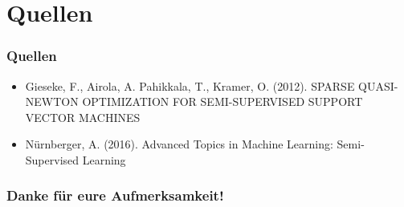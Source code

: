 \documentclass{beamer}
\begin{document}
\section{Quellen}

\begin{frame}
\frametitle{Quellen}
\begin{itemize}
\item Gieseke, F., Airola, A. Pahikkala, T., Kramer, O. (2012). SPARSE QUASI-NEWTON OPTIMIZATION FOR SEMI-SUPERVISED SUPPORT VECTOR MACHINES
\item N\"urnberger, A. (2016). Advanced Topics in Machine Learning: Semi-Supervised Learning
\end{itemize}
\end{frame}


\begin{frame}
\frametitle{Danke f\"ur eure Aufmerksamkeit!}
\end{frame}
\end{document}
